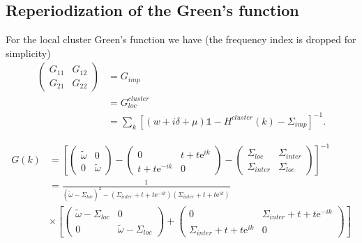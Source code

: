 \documentclass[12pt,a4paper]{scrartcl}
\numberwithin{equation}{section}
\newcommand{\unity}{\mathds{1}}
\begin{document}
\subsection{Reperiodization of the Green's function}
For the local cluster Green's function we have (the frequency index is dropped for simplicity)
\begin{align}
 \begin{pmatrix}
  G_{11} & G_{12} \\
  G_{21} & G_{22}
 \end{pmatrix}
&= G_{imp} \\
&= G^{cluster}_{loc} \\
&= \sum_k \left[ (w+i\delta+\mu )\unity - H^{cluster}(k) - \Sigma_{imp} \right]^{-1}.
\end{align}

\begin{align}
G(k) &=
\left[ 
\begin{pmatrix}
  \tilde{\omega} & 0 \\
  0 & \tilde{\omega}
 \end{pmatrix} 
- \begin{pmatrix}
  0 & t+t\mathrm{e}^{ik} \\
  t+t\mathrm{e}^{-ik} & 0
 \end{pmatrix} 
-  \begin{pmatrix}
  \Sigma_{loc} & \Sigma_{inter} \\
  \Sigma_{inter} & \Sigma_{loc}
 \end{pmatrix}
 \right]^{-1} \\
%
&= 
\frac{1}{ (\tilde{\omega}-\Sigma_{loc})^2 - (\Sigma_{inter}+t+t\mathrm{e}^{-ik})(\Sigma_{inter}+t+t\mathrm{e}^{ik}) }
 \nonumber \\ 
 & \times \left[
\begin{pmatrix}
  \tilde{\omega}-\Sigma_{loc} & 0 \\
  0 & \tilde{\omega}-\Sigma_{loc}
 \end{pmatrix} 
+ \begin{pmatrix}
  0 & \Sigma_{inter}+t+t\mathrm{e}^{-ik} \\
  \Sigma_{inter}+t+t\mathrm{e}^{ik} & 0
 \end{pmatrix} 
 \right]
\end{align}
\end{document}
